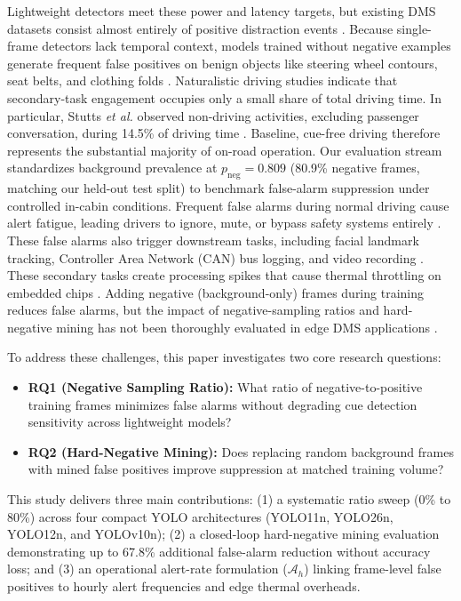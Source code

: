 \documentclass[conference]{IEEEtran}
\begin{document}
Lightweight detectors meet these power and latency targets, but existing DMS datasets consist almost entirely of positive distraction events \cite{yolodrive2025, pyolov82024}. 
Because single-frame detectors lack temporal context, models trained without negative examples generate frequent false positives on benign objects like steering wheel contours, seat belts, and clothing folds \cite{canas2021detection}. 
Naturalistic driving studies indicate that secondary-task engagement occupies only a small share of total driving time. In particular, Stutts \textit{et al.} observed non-driving activities, excluding passenger conversation, during 14.5\% of driving time \cite{stutts2005}. Baseline, cue-free driving therefore represents the substantial majority of on-road operation. Our evaluation stream standardizes background prevalence at $p_{\mathrm{neg}} = 0.809$ (80.9\% negative frames, matching our held-out test split) to benchmark false-alarm suppression under controlled in-cabin conditions. 
Frequent false alarms during normal driving cause alert fatigue, leading drivers to ignore, mute, or bypass safety systems entirely \cite{lambert2026chinese, parasuraman1997humans}. 
These false alarms also trigger downstream tasks, including facial landmark tracking, Controller Area Network (CAN) bus logging, and video recording \cite{florez2024real, liu2019edge}. 
These secondary tasks create processing spikes that cause thermal throttling on embedded chips \cite{benoitcattin2020thermal}. 
Adding negative (background-only) frames during training reduces false alarms, but the impact of negative-sampling ratios and hard-negative mining has not been thoroughly evaluated in edge DMS applications \cite{ultralytics2023guidelines, jin2018video}. 

To address these challenges, this paper investigates two core research questions:
\begin{itemize}
    \item \textbf{RQ1 (Negative Sampling Ratio):} What ratio of negative-to-positive training frames minimizes false alarms without degrading cue detection sensitivity across lightweight models?
    \item \textbf{RQ2 (Hard-Negative Mining):} Does replacing random background frames with mined false positives improve suppression at matched training volume?
\end{itemize}
This study delivers three main contributions: (1) a systematic ratio sweep (0\% to 80\%) across four compact YOLO architectures (YOLO11n, YOLO26n, YOLO12n, and YOLOv10n); (2) a closed-loop hard-negative mining evaluation demonstrating up to 67.8\% additional false-alarm reduction without accuracy loss; and (3) an operational alert-rate formulation ($\mathcal{A}_h$) linking frame-level false positives to hourly alert frequencies and edge thermal overheads.
\end{document}
